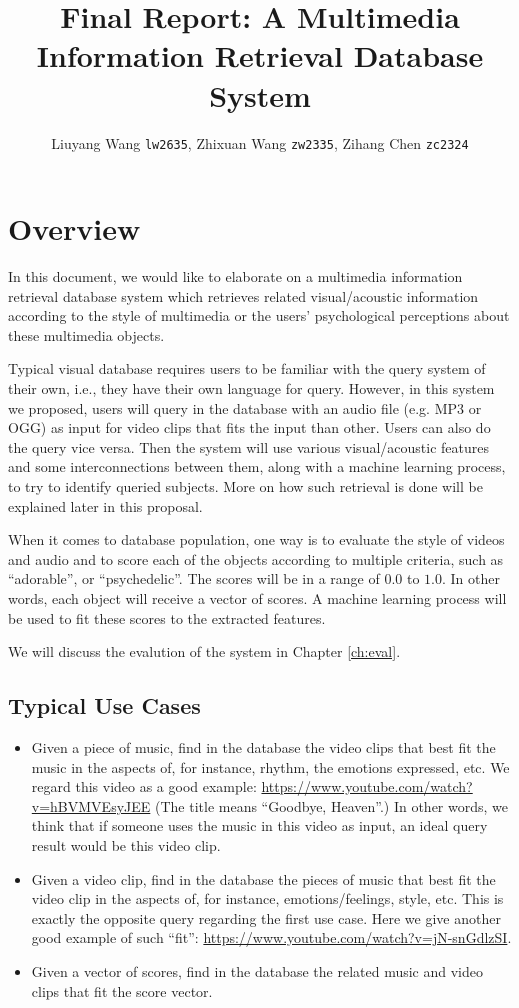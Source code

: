 \documentclass{report}
\title{Final Report: A Multimedia Information Retrieval Database System}
\author{Liuyang Wang \texttt{lw2635}, Zhixuan Wang \texttt{zw2335}, Zihang Chen \texttt{zc2324}}
\begin{document}
\maketitle
\tableofcontents

\chapter{Overview}

In this document, we would like to elaborate on a multimedia information retrieval database system which retrieves related visual/acoustic information according to the style of multimedia or the users' psychological perceptions about these multimedia objects.

Typical visual database requires users to be familiar with the query system of their own, i.e., they have their own language for query. However, in this system we proposed, users will query in the database with an audio file (e.g. MP3 or OGG) as input for video clips that fits the input than other. Users can also do the query vice versa. Then the system will use various visual/acoustic features and some interconnections between them, along with a machine learning process, to try to identify queried subjects. More on how such retrieval is done will be explained later in this proposal.

When it comes to database population, one way is to evaluate the style of videos and audio and to score each of the objects according to multiple criteria, such as ``adorable'', or ``psychedelic''. The scores will be in a range of $0.0$ to $1.0$. In other words, each object will receive a vector of scores. A machine learning process will be used to fit these scores to the extracted features.

We will discuss the evalution of the system in Chapter \ref{ch:eval}.

\section{Typical Use Cases}

\begin{itemize}
\item Given a piece of music, find in the database the video clips that best fit the music in the aspects of, for instance, rhythm, the emotions expressed, etc. We regard this video as a good example: \url{https://www.youtube.com/watch?v=hBVMVEsyJEE} (The title means ``Goodbye, Heaven''.) In other words, we think that if someone uses the music in this video as input, an ideal query result would be this video clip.
\item Given a video clip, find in the database the pieces of music that best fit the video clip in the aspects of, for instance, emotions/feelings, style, etc. This is exactly the opposite query regarding the first use case. Here we give another good example of such ``fit'': \url{https://www.youtube.com/watch?v=jN-snGdlzSI}.
\item Given a vector of scores, find in the database the related music and video clips that fit the score vector.
\end{itemize}
\end{document}
